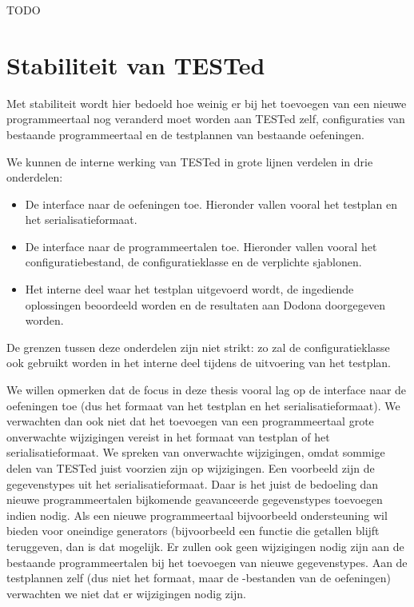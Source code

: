 TODO

\section{Stabiliteit van TESTed}\label{sec:stabiliteit-van-tested}

Met stabiliteit wordt hier bedoeld hoe weinig er bij het toevoegen van een nieuwe programmeertaal nog veranderd moet worden aan TESTed zelf, configuraties van bestaande programmeertaal en de testplannen van bestaande oefeningen.

We kunnen de interne werking van TESTed in grote lijnen verdelen in drie onderdelen:

\begin{itemize}
    \item De interface naar de oefeningen toe.
    Hieronder vallen vooral het testplan en het serialisatieformaat.
    \item De interface naar de programmeertalen toe.
    Hieronder vallen vooral het configuratiebestand, de configuratieklasse en de verplichte sjablonen.
    \item Het interne deel waar het testplan uitgevoerd wordt, de ingediende oplossingen beoordeeld worden en de resultaten aan Dodona doorgegeven worden.
\end{itemize}

De grenzen tussen deze onderdelen zijn niet strikt: zo zal de configuratieklasse ook gebruikt worden in het interne deel tijdens de uitvoering van het testplan.

We willen opmerken dat de focus in deze thesis vooral lag op de interface naar de oefeningen toe (dus het formaat van het testplan en het serialisatieformaat).
We verwachten dan ook niet dat het toevoegen van een programmeertaal grote onverwachte wijzigingen vereist in het formaat van testplan of het serialisatieformaat.
We spreken van onverwachte wijzigingen, omdat sommige delen van TESTed juist voorzien zijn op wijzigingen.
Een voorbeeld zijn de gegevenstypes uit het serialisatieformaat.
Daar is het juist de bedoeling dan nieuwe programmeertalen bijkomende geavanceerde gegevenstypes toevoegen indien nodig.
Als een nieuwe programmeertaal bijvoorbeeld ondersteuning wil bieden voor oneindige generators (bijvoorbeeld een functie die getallen blijft teruggeven, dan is dat mogelijk.
Er zullen ook geen wijzigingen nodig zijn aan de bestaande programmeertalen bij het toevoegen van nieuwe gegevenstypes.
Aan de testplannen zelf (dus niet het formaat, maar de -bestanden van de oefeningen) verwachten we niet dat er wijzigingen nodig zijn.

